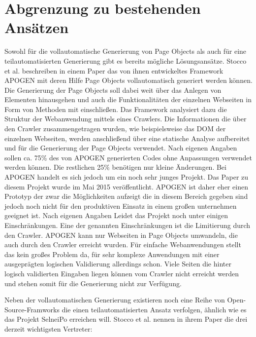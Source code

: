 \section{Abgrenzung zu bestehenden Ansätzen}
\label{sec:abgrenzung_zu_bestehenden_ansaetzen}
Sowohl für die vollautomatische Generierung von Page Objects als auch für eine teilautomatisierten Generierung gibt es bereits mögliche Lösungsansätze. 
Stocco et al. \cite{stocco_why_2015} beschreiben in einem Paper das von ihnen entwickeltes Framework APOGEN mit deren Hilfe Page Objects vollautomatisch generiert werden können. Die Generierung der Page Objects soll dabei weit über das Anlegen von Elementen hinausgehen und auch die Funktionalitäten der einzelnen Webseiten in Form von Methoden mit einschließen.
Das Framework analysiert dazu die Struktur der Webanwendung mittels eines Crawlers. Die Informationen die über den Crawler zusammengetragen wurden, wie beispielsweise das DOM der einzelnen Webseiten, werden anschließend über eine statische Analyse aufbereitet und für die Generierung der Page Objects verwendet.
Nach eigenen Angaben sollen ca. 75\% des von APOGEN generierten Codes ohne Anpassungen verwendet werden können. Die restlichen 25\% benötigen nur kleine Änderungen.
Bei APOGEN handelt es sich jedoch um ein noch sehr junges Projekt. Das Paper zu diesem Projekt wurde im Mai 2015 veröffentlicht. APOGEN ist daher eher einen Prototyp der zwar die Möglichkeiten aufzeigt die in diesem Bereich gegeben sind jedoch noch nicht für den produktiven Einsatz in einem großen unternehmen geeignet ist.
Nach eigenen Angaben Leidet das Projekt noch unter einigen Einschränkungen. Eine der genannten Einschränkungen ist die Limitierung durch den Crawler.
APOGEN kann nur Webseiten in Page Objects umwandeln, die auch durch den Crawler erreicht wurden.
Für einfache Webanwendungen stellt das kein großes Problem da, für sehr komplexe Anwendungen mit einer ausgeprägten logischen Validierung allerdings schon.
Viele Seiten die hinter logisch validierten Eingaben liegen können vom Crawler nicht erreicht werden und stehen somit für die Generierung nicht zur Verfügung.

Neben der vollautomatischen Generierung existieren noch eine Reihe von Open-Source-Framworks 
die einen teilautomatisierten Ansatz verfolgen, ähnlich wie es das Projekt SelneiPo erreichen will.
Stocco et al. \cite{stocco_why_2015} nennen in ihrem Paper die drei derzeit wichtigsten Vertreter:

